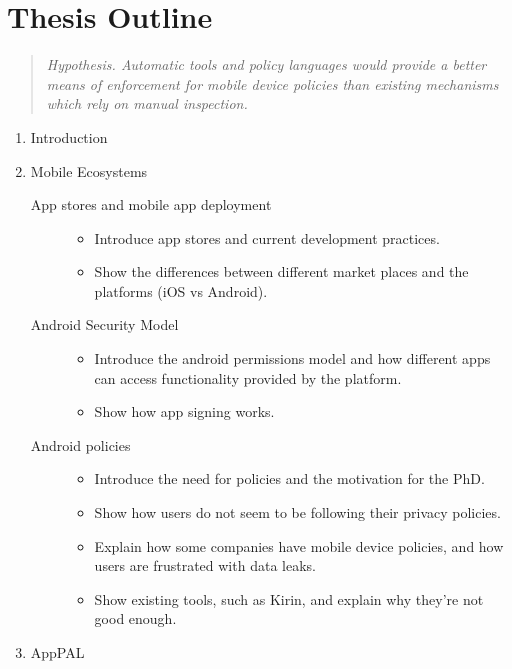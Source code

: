\documentclass{scrartcl}
\begin{document}
\section{Thesis Outline}

\begin{quote}
\emph{\emph{Hypothesis.}  Automatic tools and policy languages would provide a
better means of enforcement for mobile device policies than existing mechanisms
which rely on manual inspection.}
\end{quote}

\begin{enumerate}
  \item Introduction
  \item Mobile Ecosystems
    \begin{description}
      \item[App stores and mobile app deployment]
        \hfill
        \begin{itemize}
          \item Introduce app stores and current development practices.
          \item Show the differences between different market places and the platforms (iOS vs Android).
        \end{itemize}
      \item[Android Security Model]
        \hfill
        \begin{itemize}
          \item Introduce the android permissions model and how different apps can access functionality provided by the platform.
          \item Show how app signing works.
        \end{itemize}
      \item[Android policies]
        \hfill
        \begin{itemize}
          \item Introduce the need for policies and the motivation for the PhD.
          \item Show how users do not seem to be following their privacy policies.
          \item Explain how some companies have mobile device policies, and how users are frustrated with data leaks.
          \item Show existing tools, such as Kirin, and explain why they're not good enough.
        \end{itemize}
    \end{description}
  \item AppPAL

\end{enumerate}
\end{document}
